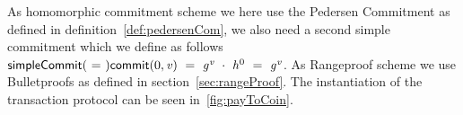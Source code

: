 As homomorphic commitment scheme we here use the Pedersen Commitment as defined in definition~\ref{def:pedersenCom}, we also need a second simple commitment which we define as follows
$\mathsf{simpleCommit}(~=~) \mathsf{commit}(0, \mathit{v}) ~=~ \mathit{g}^{\mathit{v}} ~\cdot~ \mathit{h}^{0} ~=~ \mathit{g}^{\mathit{v}}$. As Rangeproof scheme we use Bulletproofs as defined in
section~\ref{sec:rangeProof}. The instantiation of the transaction protocol can be seen in~\ref{fig:payToCoin}.
\begin{figure}
    \begin{center}
\end{center}
\end{figure}
